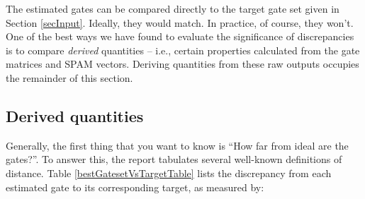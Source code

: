 \documentclass{article}[11pt]
\begin{document}
The estimated gates can be compared directly to the target gate set given in Section \ref{secInput}.  Ideally, they would match.  In practice, of course, they won't.  One of the best ways we have found to evaluate the significance of discrepancies is to compare \emph{derived} quantities -- i.e., certain properties calculated from the gate matrices and SPAM vectors.  Deriving quantities from these raw outputs occupies the remainder of this section.
\clearpage

\subsection{Derived quantities\label{derivedQtySection}}

Generally, the first thing that you want to know is ``How far from ideal are the gates?''.  To answer this, the report tabulates several well-known definitions of distance.  Table \ref{bestGatesetVsTargetTable} lists the discrepancy from each estimated gate to its corresponding target, as measured by:
\end{document}
